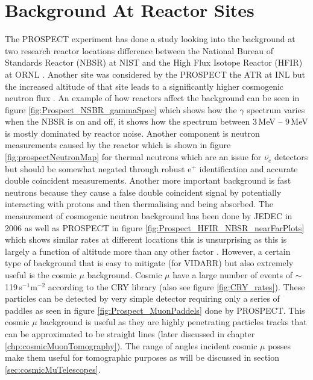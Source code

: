 \section{Background At Reactor Sites}
The PROSPECT experiment has done a  study looking into the background at two research reactor locations difference between the National Bureau of Standards Reactor (NBSR) at NIST and the High Flux Isotope Reactor (HFIR) at ORNL \cite{Ashenfelter_2016}. Another site was considered by the PROSPECT the ATR at INL but the increased altitude of that site leads to a significantly higher cosmogenic neutron flux \cite{Ashenfelter_2016}. An example of how reactors affect the background can be seen in figure \ref{fig:Prospect_NSBR_gammaSpec} which shows how the $\gamma$ spectrum varies when the NBSR is on and off, it shows how the spectrum between 3\,MeV -- 9\,MeV is mostly dominated by reactor noise. Another component is neutron measurements caused by the reactor which is shown in figure \ref{fig:prospectNeutronMap} for thermal neutrons which are an issue for $\bar{\nu_e}$ detectors but should be somewhat negated through robust e$^+$ identification and accurate double coincident measurements. Another more important background is fast neutrons because they cause a false double coincident signal by potentially interacting with protons and then thermalising and being absorbed. The measurement of cosmogenic neutron background has been done by JEDEC in 2006 \cite{JEDEC_2006} as well as PROSPECT in figure \ref{fig:Prospect_HFIR_NBSR_nearFarPlots} which shows similar rates at different locations this is unsurprising as this is largely a function of altitude more than any other factor \cite{Ashenfelter_2016}. However, a certain type of background that is easy to mitigate (for VIDARR) but also extremely useful is the cosmic $\mu$ background. Cosmic $\mu$ have a large number of events of $\sim$ 119\,s$^{-1}$m$^{-2}$ according to the CRY library \cite{ieee_cry_2007} (also see figure \ref{fig:CRY_rates}). These particles can be detected by very simple detector requiring only a series of paddles as seen in figure \ref{fig:Prospect_MuonPaddels} done by PROSPECT. This cosmic $\mu$ background is useful as they are highly penetrating particles tracks that can be approximated to be straight lines (later discussed in chapter \ref{chp:cosmicMuonTomography}). The range of angles incident cosmic $\mu$ posses make them useful for tomographic purposes as will be discussed in section \ref{sec:cosmicMuTelescopes}. %


